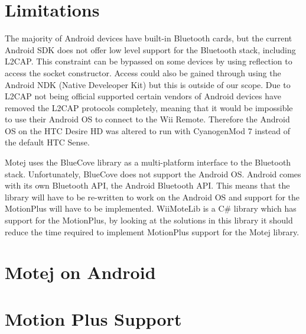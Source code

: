 \documentclass[11pt,twoside,a4paper]{report}
\begin{document}
\section{Limitations}
The majority of Android devices have built-in Bluetooth cards, but the current Android SDK does not offer low level support for the Bluetooth stack, including L2CAP. This constraint can be bypassed on some devices by using reflection to access the socket constructor\cite{l2capHtc}. Access could also be gained through using the Android NDK (Native Develeoper Kit) but this is outside of our scope. Due to L2CAP not being official supported certain vendors of Android devices have removed the L2CAP protocols completely, meaning that it would be impossible to use their Android OS to connect to the Wii Remote. Therefore the Android OS on the HTC Desire HD was altered to run with CyanogenMod 7 instead of the default HTC Sense.

Motej uses the BlueCove library as a multi-platform interface to the Bluetooth stack. Unfortunately, BlueCove does not support the Android OS. Android comes with its own Bluetooth API, the Android Bluetooth API. This means that the library will have to be re-written to work on the Android OS and support for the MotionPlus will have to be implemented. WiiMoteLib\cite{wiiMoteLib} is a C\# library which has support for the MotionPlus, by looking at the solutions in this library it should reduce the time required to implement MotionPlus support for the Motej library.

\section{Motej on Android}


\section{Motion Plus Support}







\end{document}
